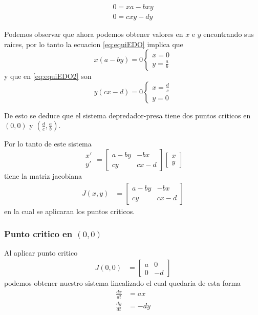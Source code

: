 \documentclass{report}
\begin{document}
\begin{align}
0= xa-bxy \label{eq:equiEDO} \\
0= cxy-dy \label{eq:equiEDO2}
\end{align}

Podemos observar que ahora podemos obtener valores en $x$ e $y$ encontrando sus raices, por lo tanto la ecuacion \ref{eq:equiEDO} implica que
\begin{equation}
x(a-by)= 0
\begin{cases}
x=0\\
y=\frac{a}{b}
\end{cases}
\end{equation}
y que en \ref{eq:equiEDO2} son
\begin{equation}
y(cx-d)= 0
\begin{cases}
x=\frac{d}{c}\\
y=0
\end{cases}
\end{equation}

De esto se deduce que el sistema depredador-presa tiene dos puntos criticos en $(0,0)$ y  $(\frac{d}{c},\frac{a}{b})$.

Por lo tanto de este sistema
\begin{equation*}
\begin{array}{c}
x' \\
y'
\end{array} 
=
\left[
\begin{matrix}
a-by &-bx\\
cy &cx-d
\end{matrix}\right]
\left[\begin{array}{c}
x\\
y
\end{array}\right]
\end{equation*}
tiene la matriz jacobiana
\begin{align*}
J(x,y)&=
\left[
\begin{matrix}
a-by &-bx\\
cy &cx-d
\end{matrix}\right]
\end{align*}
en la cual se aplicaran los puntos criticos.

\subsubsection{Punto critico en $(0,0)$}
Al aplicar punto critico
\begin{align}
J(0,0)&=
\left[
\begin{matrix}
a &0\\
0 &-d
\end{matrix}\right]
\end{align}
podemos obtener nuestro sistema linealizado el cual quedaria de esta forma
\begin{align}
\frac{dx}{dt}&= ax \nonumber\\
\frac{dy}{dt}&= -dy \label{eq:sisPC1}
\end{align}
\end{document}
